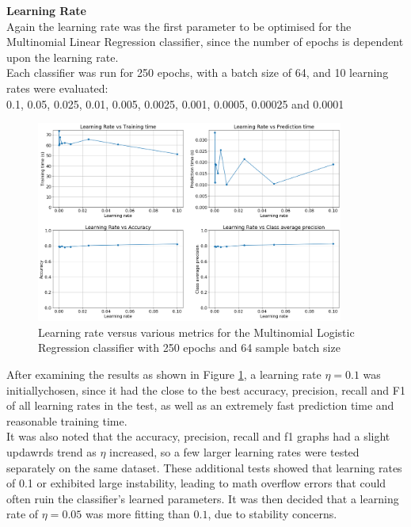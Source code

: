 \documentclass[11pt,a4paper]{article}
\begin{document}
\noindent\textbf{Learning Rate}\\
Again the learning rate was the first parameter to be optimised for the Multinomial Linear Regression classifier, since the number of epochs is dependent upon the learning rate.\\

\noindent Each classifier was run for 250 epochs, with a batch size of 64, and 10 learning rates were evaluated:\\
0.1, 0.05, 0.025, 0.01, 0.005, 0.0025, 0.001, 0.0005, 0.00025 and 0.0001\\

\begin{figure}[H]
    \centering
    \includegraphics[width=0.9\textwidth]{img/mlr_eta_test.png}
    \caption{Learning rate versus various metrics for the Multinomial Logistic Regression classifier with 250 epochs and 64 sample batch size}
    \label{fig:multinomial_logistic_regression_eta_tuning}
\end{figure}

\noindent After examining the results as shown in Figure \ref{fig:multinomial_logistic_regression_eta_tuning}, a learning rate $\eta = 0.1$ was initiallychosen, since it had the close to the best accuracy, precision, recall and F1 of all learning rates in the test, as well as an extremely fast prediction time and reasonable training time.\\

\noindent It was also noted that the accuracy, precision, recall and f1 graphs had a slight updawrds trend as $\eta$ increased, so a few larger learning rates were tested separately on the same dataset. These additional tests showed that learning rates of 0.1 or exhibited large instability, leading to math overflow errors that could often ruin the classifier's learned parameters. It was then decided that a learning rate of $\eta = 0.05$ was more fitting than $0.1$, due to stability concerns.\\
\end{document}
